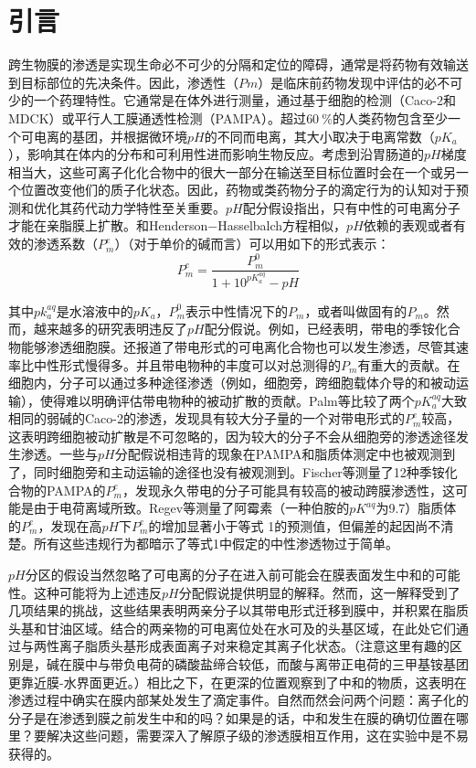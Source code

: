 \documentclass[journal=,manuscript=artical,email=false]{achemso}
\begin{document}
\section{引言}
跨生物膜的渗透是实现生命必不可少的分隔和定位的障碍，通常是将药物有效输送到目标部位的先决条件。因此，渗透性（$Pm$）是临床前药物发现中评估的必不可少的一个药理特性。它通常是在体外进行测量，通过基于细胞的检测（Caco-2和MDCK）或平行人工膜通透性检测（PAMPA）。超过$60~\%$的人类药物包含至少一个可电离的基团，并根据微环境$pH$的不同而电离，其大小取决于电离常数（$pK_a$），影响其在体内的分布和可利用性进而影响生物反应。考虑到沿胃肠道的$pH$梯度相当大，这些可离子化化合物中的很大一部分在输送至目标位置时会在一个或另一个位置改变他们的质子化状态。因此，药物或类药物分子的滴定行为的认知对于预测和优化其药代动力学特性至关重要。$pH$配分假设指出，只有中性的可电离分子才能在亲脂膜上扩散。和Henderson−Hasselbalch方程相似，$pH$依赖的表观或者有效的渗透系数（$P^e_{m}$）（对于单价的碱而言）可以用如下的形式表示：
\begin{equation}
P^{e}_{m} = \frac{P^{0}_{m}}{1+10^{pK^{aq}_a}-pH}
\end{equation}

其中$pk^{aq}_a$是水溶液中的$pK_a$，$P^0_m$表示中性情况下的$P_m$，或者叫做固有的$P_m$。然而，越来越多的研究表明违反了$pH$配分假说。例如，已经表明，带电的季铵化合物能够渗透细胞膜。还报道了带电形式的可电离化合物也可以发生渗透，尽管其速率比中性形式慢得多。并且带电物种的丰度可以对总测得的$P_m$有重大的贡献。在细胞内，分子可以通过多种途径渗透（例如，细胞旁，跨细胞载体介导的和被动运输），使得难以明确评估带电物种的被动扩散的贡献。Palm等比较了两个$pK^{aq}_a$大致相同的弱碱的Caco-2的渗透，发现具有较大分子量的一个对带电形式的$P^e_m$较高，这表明跨细胞被动扩散是不可忽略的，因为较大的分子不会从细胞旁的渗透途径发生渗透。一些与$pH$分配假说相违背的现象在PAMPA和脂质体测定中也被观测到了，同时细胞旁和主动运输的途径也没有被观测到。Fischer等测量了12种季铵化合物的PAMPA的$P^e_m$，发现永久带电的分子可能具有较高的被动跨膜渗透性，这可能是由于电荷离域所致。Regev等测量了阿霉素（一种伯胺的$pK^{aq}$为9.7）脂质体的$P^e_m$，发现在高$pH$下$P^e_m$的增加显著小于等式 1的预测值，但偏差的起因尚不清楚。所有这些违规行为都暗示了等式1中假定的中性渗透物过于简单。

$pH$分区的假设当然忽略了可电离的分子在进入前可能会在膜表面发生中和的可能性。这种可能将为上述违反$pH$分配假说提供明显的解释。然而，这一解释受到了几项结果的挑战，这些结果表明两亲分子以其带电形式迁移到膜中，并积累在脂质头基和甘油区域。结合的两亲物的可电离位处在水可及的头基区域，在此处它们通过与两性离子脂质头基形成表面离子对来稳定其离子化状态。（注意这里有趣的区别是，碱在膜中与带负电荷的磷酸盐缔合较低，而酸与离带正电荷的三甲基铵基团更靠近膜-水界面更近。）相比之下，在更深的位置观察到了中和的物质，这表明在渗透过程中确实在膜内部某处发生了滴定事件。自然而然会问两个问题：离子化的分子是在渗透到膜之前发生中和的吗？如果是的话，中和发生在膜的确切位置在哪里？要解决这些问题，需要深入了解原子级的渗透膜相互作用，这在实验中是不易获得的。
\end{document}
